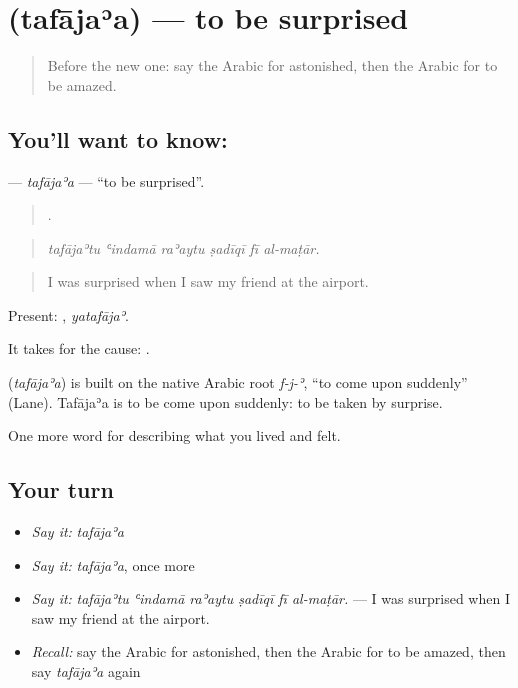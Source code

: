 \section[\texorpdfstring{\ar{تفاجأ} (tafājaʾa)}{تفاجأ (tafājaʾa)}]{ (tafājaʾa) — to be surprised}

\label{lesson:AR-C490-tafajaa}



\begin{quote}
Before the new one: say the Arabic for astonished, then the Arabic for to be amazed.
\end{quote}

\subsection*{You'll want to know: }
\textbf{} — \emph{tafājaʾa} — \textquotedblleft{}to be surprised\textquotedblright{}.

\begin{quote}
     .
\end{quote}

\begin{quote}
\emph{tafājaʾtu ʿindamā raʾaytu ṣadīqī fī al-maṭār.}
\end{quote}

\begin{quote}
I was surprised when I saw my friend at the airport.
\end{quote}

Present: , \emph{yatafājaʾ}.

It takes  for the cause:  .

\begin{cousinweb}
\textbf{} (\emph{tafājaʾa}) is built on the native Arabic root \emph{f-j-ʾ}, \textquotedblleft{}to come upon suddenly\textquotedblright{} (Lane). Tafājaʾa is to be come upon suddenly: to be taken by surprise.
\end{cousinweb}

\begin{grammarlens}[title={What you've built}]
One more word for describing what you lived and felt.
\end{grammarlens}

\subsection*{Your turn}
\begin{itemize}
\raggedright
  \item \emph{Say it:} \emph{tafājaʾa}
  \item \emph{Say it:} \emph{tafājaʾa}, once more
  \item \emph{Say it:} \emph{tafājaʾtu ʿindamā raʾaytu ṣadīqī fī al-maṭār.} — I was surprised when I saw my friend at the airport.
  \item \emph{Recall:} say the Arabic for astonished, then the Arabic for to be amazed, then say \emph{tafājaʾa} again
\end{itemize}

